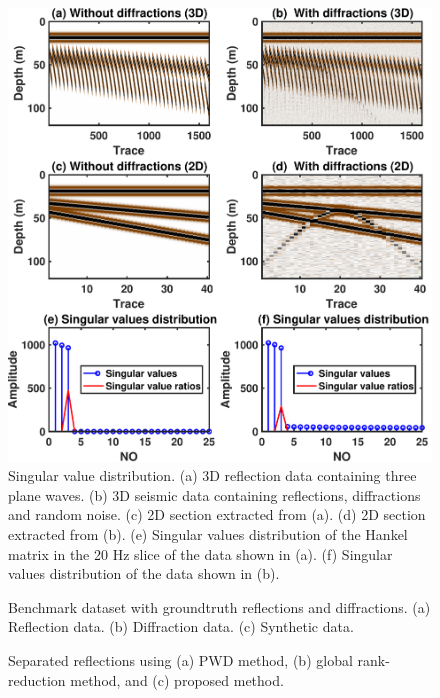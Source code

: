 \documentclass[10pt]{IEEEtran}
\begin{document}
\begin{figure}[htb!]
\centering
\includegraphics[width=\columnwidth]{Fig/demosigma}
\caption{Singular value distribution. (a) 3D reflection data containing three plane waves. (b) 3D seismic data containing reflections, diffractions and random noise. (c) 2D section extracted from (a). (d) 2D section extracted from (b). (e) Singular values distribution of the Hankel matrix in the 20 Hz slice of the data shown in (a).  (f) Singular values distribution of the data shown in (b). }
\label{fig:demosigma}
\end{figure}


\begin{figure}[htb!]
 \centering
\caption{Benchmark dataset with groundtruth reflections and diffractions. (a) Reflection data. (b) Diffraction data. (c) Synthetic data. }
\label{fig:refl,diffr,syn}
\end{figure}

\begin{figure}[htb!]
 \centering
\caption{Separated reflections using (a) PWD method, (b) global rank-reduction method, and (c) proposed method.}
\label{fig:s-pwd-0,s-grr-0,s-lrra-0}
\end{figure}
\end{document}
